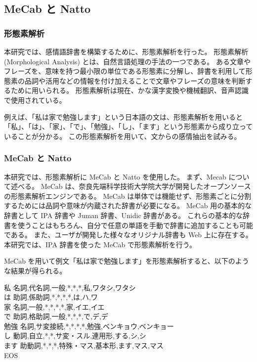 \documentclass[11pt,a4j]{jsarticle}
\begin{document}
\subsection{MeCab と Natto}
\subsubsection{形態素解析}
本研究では、感情語辞書を構築するために、形態素解析を行った。
形態素解析 (Morphological Analysis) とは、自然言語処理の手法の一つである。
ある文章やフレーズを、意味を持つ最小限の単位である形態素に分解し、辞書を利用して形態素の品詞や活用などの情報を付け加えることで文章やフレーズの意味を判断するために用いられる。
形態素解析は現在、かな漢字変換や機械翻訳、音声認識で使用されている。

例えば、「私は家で勉強します」という日本語の文は、形態素解析を用いると「私」、「は」、「家」、「で」、「勉強」、「し」、「ます」という形態素から成り立っていることが分かる。
この形態素解析を用いて、文からの感情抽出を試みる。

\subsubsection{MeCab と Natto}
本研究では、形態素解析に MeCab と Natto を使用した。
まず、Mecab について述べる。
MeCab  は、奈良先端科学技術大学院大学が開発したオープンソースの形態素解析エンジンである。
MeCab は単体では機能せず、形態素ごとに分割するためには品詞や意味が内蔵された辞書が必要になる。
MeCab 用の基本的な辞書として IPA 辞書や Juman 辞書、Unidic 辞書がある。
これらの基本的な辞書を使うことはもちろん、自分で任意の単語を手動で辞書に追加することも可能である。
また、ユーザが開発した様々なオリジナル辞書も Web 上に存在する。
本研究では、IPA 辞書を使った MeCab で形態素解析を行う。

MeCab を用いて例文「私は家で勉強します」を形態素解析すると、以下のような結果が得られる。

\begin{itembox}[l]
私  名詞,代名詞,一般,*,*,*,私,ワタシ,ワタシ\\
は  助詞,係助詞,*,*,*,*,は,ハ,ワ\\
家  名詞,一般,*,*,*,*,家,イエ,イエ\\
で  助詞,格助詞,一般,*,*,*,で,デ,デ\\
勉強  名詞,サ変接続,*,*,*,*,勉強,ベンキョウ,ベンキョー\\
し  動詞,自立,*,*,サ変・スル,連用形,する,シ,シ\\
ます  助動詞,*,*,*,特殊・マス,基本形,ます,マス,マス\\
EOS
\end{itembox}
\end{document}
